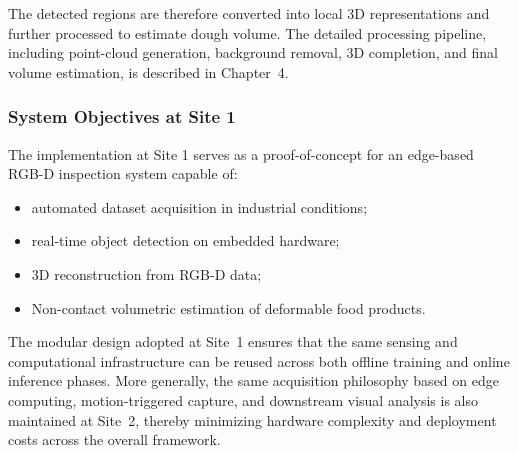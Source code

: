 The detected regions are therefore converted into local 3D representations and further processed to estimate dough volume. The detailed processing pipeline, including point-cloud generation, background removal, 3D completion, and final volume estimation, is described in Chapter~4.

\subsubsection{System Objectives at Site 1}

The implementation at Site 1 serves as a proof-of-concept for an edge-based RGB-D inspection system capable of:

\begin{itemize}
    \item automated dataset acquisition in industrial conditions;
    \item real-time object detection on embedded hardware;
    \item 3D reconstruction from RGB-D data;
    \item Non-contact volumetric estimation of deformable food products.
\end{itemize}

The modular design adopted at Site~1 ensures that the same sensing and computational infrastructure can be reused across both offline training and online inference phases. More generally, the same acquisition philosophy based on edge computing, motion-triggered capture, and downstream visual analysis is also maintained at Site~2, thereby minimizing hardware complexity and deployment costs across the overall framework.
